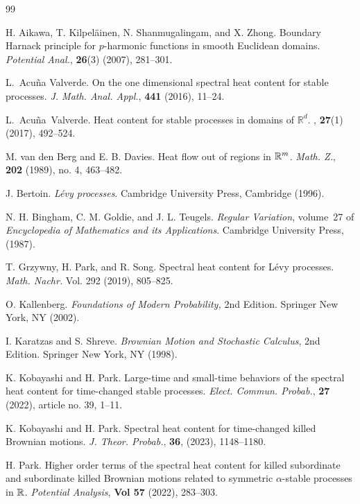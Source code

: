 \documentclass[11pt]{article}
\begin{document}
\begin{doublespace}
\begin{singlespace}
\begin{thebibliography}{99}


H. Aikawa, T. Kilpel\"{a}inen, N. Shanmugalingam, and X. Zhong.
Boundary Harnack principle for $p$-harmonic functions in smooth Euclidean domains. \textit{Potential Anal.}, \textbf{26}(3) (2007), 281--301.

L.~Acu\~{n}a Valverde.
On the one dimensional spectral heat content for stable processes.
{\it J. Math. Anal. Appl.},  {\bf 441}  (2016),  11--24. 

L.~Acu{\~n}a~Valverde.
\newblock Heat content for stable processes in domains of $\mathbb{R}^d$.
, \textbf{27}(1) (2017), 492--524.

M. van den Berg and E. B. Davies.
Heat flow out of regions in ${\mathbb R}^{m}$.
{\it Math. Z.}, {\bf 202} (1989), no. 4, 463--482.

 J. Bertoin.
\textit{L\'evy processes}.
Cambridge University Press, Cambridge (1996).

N. H. Bingham, C. M. Goldie, and J. L. Teugels.
\textit{Regular Variation}, volume~27 of {\em Encyclopedia of
  Mathematics and its Applications}. Cambridge University Press, (1987).



 T. Grzywny, H. Park, and R. Song.
Spectral heat content for L\'evy processes.
\textit{Math. Nachr.} Vol. 292 (2019), 805--825.


O. Kallenberg. 
\textit{Foundations of Modern Probability,} 2nd Edition. 
Springer New York, NY (2002). 



I. Karatzas and S. Shreve.
\textit{Brownian Motion and Stochastic Calculus}, 2nd Edition. 
Springer New York, NY (1998).


K. Kobayashi and H. Park. 
Large-time and small-time behaviors of the spectral heat content for time-changed stable processes.
{\em Elect. Commun. Probab.}, {\bf 27} (2022), article no. 39, 1--11. 

K. Kobayashi and H. Park. 
Spectral heat content for time-changed killed Brownian motions. 
{\em J. Theor. Probab.}, {\bf 36}, (2023), 1148--1180. 


H. Park. 
Higher order terms of the spectral heat content for killed subordinate and subordinate killed Brownian motions related to symmetric $\alpha$-stable processes in ${\mathbb R}$.  
{\em Potential Analysis},  \textbf{Vol 57} (2022), 283--303.


\end{thebibliography}
\end{singlespace}
\end{doublespace}
\end{document}
